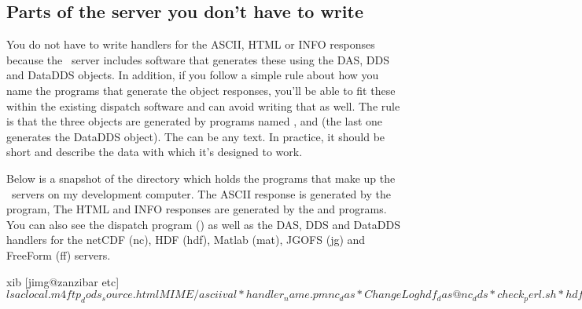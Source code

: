 \documentclass{dods-paper}
\begin{document}
\subsection{Parts of the server you don't have to write}

You do not have to write handlers for the ASCII, HTML or INFO
responses because the \opendap\ server includes software that generates
these using the DAS, DDS and DataDDS objects. In addition, if you
follow a simple rule about how you name the programs that generate the
object responses, you'll be able to fit these within the existing
dispatch software and can avoid writing that as well.  The rule is
that the three objects are generated by programs named
,  and
 (the last one generates the DataDDS object).
The  can be any text. In practice, it should be short and
describe the data with which it's designed to work.
 
Below is a snapshot of the directory which holds the programs that
make up the \opendap\ servers on my development computer. The ASCII
response is generated by the  program, The HTML and INFO
responses are generated by the  and 
programs. You can also see the dispatch program () as
well as the DAS, DDS and DataDDS handlers for the netCDF (nc), HDF (hdf),
Matlab (mat), JGOFS (jg) and FreeForm (ff) servers.
 
\begin{vcode}{xib}
[jimg@zanzibar etc]$ ls
aclocal.m4            ftp_dods_source.html   MIME/
asciival*             handler_name.pm        nc_das*
ChangeLog             hdf_das@               nc_dds*
check_perl.sh*        hdf_dds@               nc_dods*
common_tests.exp      hdf_dods*              nightly_dods_build.conf
config.guess*         HTML/
nightly_dods_build.conf.example
config.sub*           HTTP/                  nightly_dods_build.sh*
COPYRIGHT             INSTALL-clients        nph-dods*
CVS/                  INSTALL-matlab-client  nph-dods.in*
cvsdate*              installServers         printenv*
def*                  INSTALL-servers        README
deflate*              install-sh*            README-Matlab-GUI
depend.sh*            jg_das*                tar-builder.pl*
DODS_Cache.pm         jg_dds*                test-dispatch.sh*
DODS_Dispatch.pm      jg_dods*               ud_aclocal.m4
dods.ini              jgofs_objects_readme*  update-manifest.pl*
ff_das*               localize.sh*           update-manifest.pl~*
ff_dds*               LWP/                   usage*
ff_dods*              Makefile.common        usage~*
FilterDirHTML.pm      mat_das*               usage-jg*
ftp_dods_binary.html  mat_dds*               www_int*
ftp_dods_ml_gui.html  mat_dods*
[jimg@zanzibar etc]$ 
\end{vcode}
\end{document}
